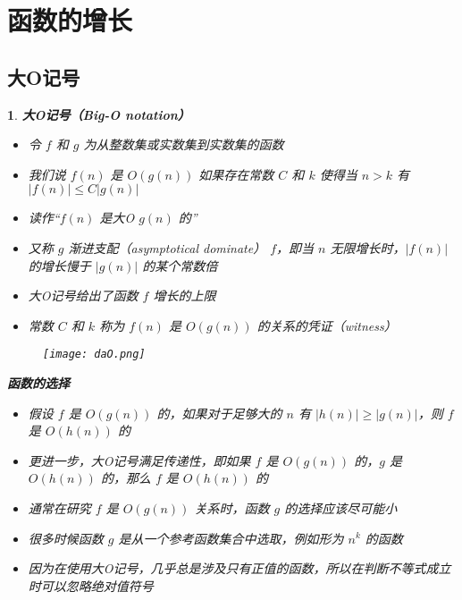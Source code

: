 \documentclass[UTF8]{report}
\theoremstyle{MyLineTheoremStyle} %
\theoremstyle{MyBlockTheoremStyle} %
\theoremstyle{MySubsubsectionStyle} %
\newtheorem{definition}{}
\begin{document}
\section{函数的增长}

\subsection{大O记号}

\begin{definition}
    \textbf{大O记号（Big-O notation）}
    \begin{itemize}
        \item 令 $f$ 和 $g$ 为从整数集或实数集到实数集的函数
        \item 我们说 $f(n)$ 是 $O(g(n))$ 如果存在常数 $C$ 和 $k$ 使得当 $n > k$ 有 $|f(n)| \leq C |g(n)|$
        \item 读作“$f(n)$ 是大O $g(n)$ 的”
        \item 又称 $g$ 渐进支配（asymptotical dominate） $f$，即当 $n$ 无限增长时，$|f(n)|$ 的增长慢于 $|g(n)|$ 的某个常数倍
        \item 大O记号给出了函数 $f$ 增长的上限
        \item 常数 $C$ 和 $k$ 称为 $f(n)$ 是 $O(g(n))$ 的关系的凭证（witness）
    \end{itemize}

    \begin{figure}[ht]
        \centering
        \texttt{[image: daO.png]}
    \end{figure}

    \textbf{函数的选择}
    \begin{itemize}
        \item 假设 $f$ 是 $O(g(n))$ 的，如果对于足够大的 $n$ 有 $|h(n)| \geq |g(n)|$，则 $f$ 是 $O(h(n))$ 的
        \item 更进一步，大O记号满足传递性，即如果 $f$ 是 $O(g(n))$ 的，$g$ 是 $O(h(n))$ 的，那么 $f$ 是 $O(h(n))$ 的
        \item 通常在研究 $f$ 是 $O(g(n))$ 关系时，函数 $g$ 的选择应该尽可能小
        \item 很多时候函数 $g$ 是从一个参考函数集合中选取，例如形为 $n^k$ 的函数
        \item 因为在使用大O记号，几乎总是涉及只有正值的函数，所以在判断不等式成立时可以忽略绝对值符号
    \end{itemize}


\end{definition}
\end{document}
